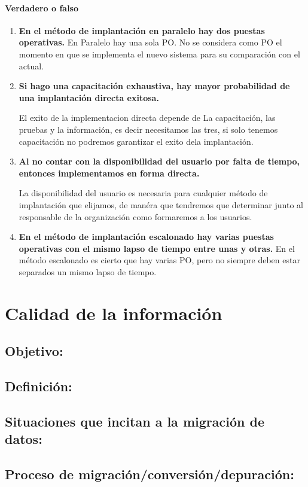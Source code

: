 \documentclass[12pt]{book}
\begin{document}
\subsubsection{Verdadero o falso}
	\begin{enumerate}
		\item \textbf{En el método de implantación en paralelo hay dos puestas operativas.}
				En Paralelo hay una sola PO. No se considera como PO el momento en que se implementa el 						nuevo sistema para su comparación con el actual.
		\item \textbf{Si hago una capacitación exhaustiva, hay mayor probabilidad de una implantación 							directa exitosa.} 
		
				El exito de la implementacion directa depende de La capacitación, las pruebas y la 								información, es decir necesitamos las tres, si solo tenemos capacitación no podremos 							garantizar el exito dela implantación.
		\item \textbf{Al no contar con la disponibilidad del usuario por falta de tiempo, entonces 								implementamos en forma directa.}
				
				La disponibilidad del usuario es necesaria para cualquier método de implantación que 							elijamos, de manéra que tendremos que determinar junto al responsable de la organización 
				como formaremos a los usuarios.
		\item \textbf{En el método de implantación escalonado hay varias puestas operativas con el mismo 						lapso de tiempo entre unas y otras.}
				En el método escalonado es cierto que hay varias PO, pero no siempre deben estar separados 
				un mismo lapso de tiempo.
	\end{enumerate}

\chapter{Calidad de la información}
\section{Objetivo:}
\section{Definición:}
\section{Situaciones que incitan a la migración de datos:}
\section{Proceso de migración/conversión/depuración:}
\end{document}

